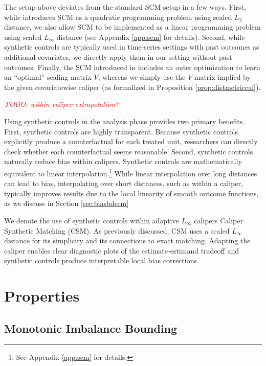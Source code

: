 \documentclass{article}
\newcommand{\note}[1]{\textcolor{red}{\textit{#1}}}
\begin{document}
The setup above deviates from the standard SCM setup in a few ways.
First, while \citet{abadie2010synthetic} introduces SCM as a quadratic programming problem using scaled $L_2$ distance, we also allow SCM to be implemented as a linear programming problem using scaled $L_\infty$ distance (see Appendix \ref{app:scm} for details).
Second, while synthetic controls are typically used in time-series settings with past outcomes as additional covariates, we directly apply them in our setting without past outcomes.
Finally, the SCM introduced in \citet{abadie2010synthetic} includes an outer optimization to learn an ``optimal'' scaling matrix $V$, whereas we simply use the $V$ matrix implied by the given covariatewise caliper (as formalized in Proposition \ref{prop:distmetriccal}).

\note{TODO: within-caliper extrapolation?}

Using synthetic controls in the analysis phase provides two primary benefits.
First, synthetic controls are highly transparent.
Because synthetic controls explicitly produce a counterfactual for each treated unit, researchers can directly check whether each counterfactual seems reasonable.
Second, synthetic controls naturally reduce bias within calipers.
Synthetic controls are mathematically equivalent to linear interpolation.\footnote{See Appendix \ref{app:scm} for details.}
While linear interpolation over long distances can lead to bias, interpolating over short distances, such as within a caliper, typically improves results due to the local linearity of smooth outcome functions, as we discuss in Section \ref{sec:biasbdscm}

We denote the use of synthetic controls within adaptive $L_\infty$ calipers Caliper Synthetic Matching (CSM).
As previously discussed, CSM uses a scaled $L_\infty$ distance for its simplicity and its connections to exact matching.
Adapting the caliper enables clear diagnostic plots of the estimate-estimand tradeoff and synthetic controls produce interpretable local bias corrections.

\section{Properties}
\label{sec:properties}
\subsection{Monotonic Imbalance Bounding}
\label{sec:mib}
\end{document}
